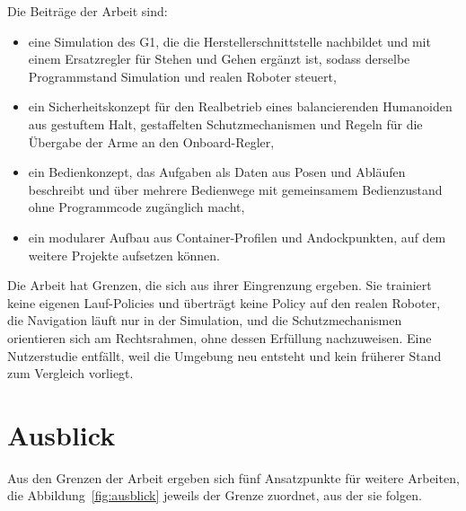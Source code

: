
Die Beiträge der Arbeit sind:
\begin{itemize}
  \item eine Simulation des G1, die die Herstellerschnittstelle nachbildet und mit einem Ersatzregler für Stehen und Gehen ergänzt ist, sodass derselbe Programmstand Simulation und realen Roboter steuert,
  \item ein Sicherheitskonzept für den Realbetrieb eines balancierenden Humanoiden aus gestuftem Halt, gestaffelten Schutzmechanismen und Regeln für die Übergabe der Arme an den Onboard-Regler,
  \item ein Bedienkonzept, das Aufgaben als Daten aus Posen und Abläufen beschreibt und über mehrere Bedienwege mit gemeinsamem Bedienzustand ohne Programmcode zugänglich macht,
  \item ein modularer Aufbau aus Container-Profilen und Andockpunkten, auf dem weitere Projekte aufsetzen können.
\end{itemize}

Die Arbeit hat Grenzen, die sich aus ihrer Eingrenzung ergeben.
Sie trainiert keine eigenen Lauf-Policies und überträgt keine Policy auf den realen Roboter, die Navigation läuft nur in der Simulation, und die Schutzmechanismen orientieren sich am Rechtsrahmen, ohne dessen Erfüllung nachzuweisen.
Eine Nutzerstudie entfällt, weil die Umgebung neu entsteht und kein früherer Stand zum Vergleich vorliegt.

\section{Ausblick}
\label{sec:ausblick}
Aus den Grenzen der Arbeit ergeben sich fünf Ansatzpunkte für weitere Arbeiten, die Abbildung~\ref{fig:ausblick} jeweils der Grenze zuordnet, aus der sie folgen.


